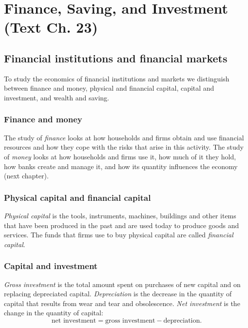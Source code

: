 \chapter{Finance, Saving, and Investment (Text Ch. 23)}

\section{Financial institutions and financial markets}

To study the economics of financial institutions and markets we distinguish between
finance and money, physical and financial capital, capital and investment, and wealth and
saving.

\subsection{Finance and money}

The study of \emph{finance} looks at how households and firms obtain and use financial
resources and how they cope with the risks that arise in this activity. The study of
\emph{money} looks at how households and firms use it, how much of it they hold, how banks
create and manage it, and how its quantity influences the economy (next chapter).

\subsection{Physical capital and financial capital}

\begin{definition}
\emph{Physical capital} is the tools, instruments, machines, buildings and other items
that have been produced in the past and are used today to produce goods and services.
The funds that firms use to buy physical capital are called \emph{financial capital}.
\end{definition}

\subsection{Capital and investment}

\begin{definition}
\emph{Gross investment} is the total amount spent on purchases of new capital and on
replacing depreciated capital. \emph{Depreciation} is the decrease in the quantity of
capital that results from wear and tear and obsolescence. \emph{Net investment} is the
change in the quantity of capital:
\[
  \text{net investment} = \text{gross investment} - \text{depreciation}.
\]
\end{definition}

